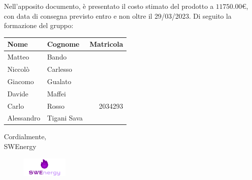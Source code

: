 Nell’apposito documento, è presentato il costo stimato del prodotto a 
$11750.00$€, 
con data di consegna previsto entro e non oltre il 29/03/2023. Di seguito la
formazione del gruppo:

\begin{center}
{
\renewcommand{\arraystretch}{1.5}
\begin{tabular}{llr}
	\textbf{Nome} & \textbf{Cognome}	& \textbf{Matricola}	\\
	\toprule
	Matteo		&	Bando				&						\\
	Niccolò 	&	Carlesso		 	& 						\\
	Giacomo 	&	Gualato			 	& 						\\
	Davide		&	Maffei			 	& 						\\
	Carlo		&	Rosso			 	&	2034293				\\
	Alessandro	&	Tigani Sava		 	&						\\
	\bottomrule
\end{tabular}
}
\end{center}

\vspace{1cm}

\noindent
Cordialmente, \\
SWEnergy

\begin{figure}[H]
	\includegraphics[width=0.2\textwidth]{img/logo.png}
\end{figure}
